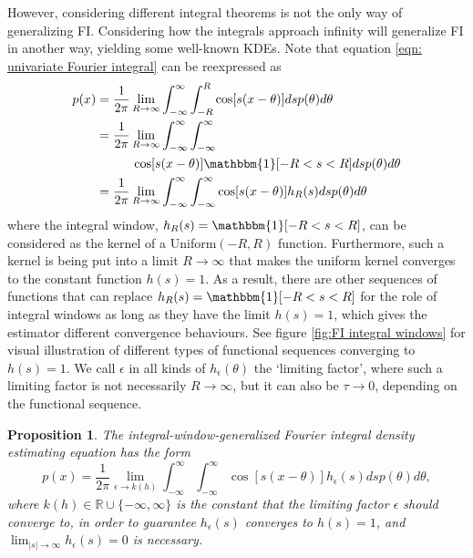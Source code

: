 \documentclass[%
 reprint,
 amsmath,amssymb,
 aps,
]{revtex4-2}
\newtheorem{proposition}[theorem]{Proposition}
\def\R{\mathbb{R}}
\begin{document}
However, considering different integral theorems is not the only way of generalizing FI. Considering how the integrals approach infinity will generalize FI in another way, yielding some well-known KDEs. Note that equation \eqref{eqn: univariate Fourier integral} can be reexpressed as
\begin{align*}
    p(x) & = \frac{1}{2\pi} \lim_{R \to \infty} \int_{-\infty}^\infty \int_{-R}^R \cos[s(x-\theta)]ds p(\theta)d\theta \\
    & = \frac{1}{2\pi} \lim_{R \to \infty} \int_{-\infty}^\infty \int_{-\infty}^\infty \\
    & \hspace{1cm}\cos[s(x-\theta)] \mathbbm{1}[-R < s < R] ds p(\theta) d\theta \\
    & = \frac{1}{2\pi} \lim_{R \to \infty} \int_{-\infty}^\infty \int_{-\infty}^\infty \cos[s(x-\theta)]h_R(s)ds p(\theta)d\theta
\end{align*}
where the integral window, $h_R(s) = \mathbbm{1}[-R < s < R]$, can be considered as the kernel of a Uniform$(-R, R)$ function. Furthermore, such a kernel is being put into a limit $R \to \infty$ that makes the uniform kernel converges to the constant function $h(s) = 1$. As a result, there are other sequences of functions that can replace $h_R(s) = \mathbbm{1}[-R < s < R]$ for the role of integral windows as long as they have the limit $h(s) = 1$, which gives the estimator different convergence behaviours. See figure \ref{fig:FI integral windows} for visual illustration of different types of functional sequences converging to $h(s) = 1$. We call $\epsilon$ in all kinds of $h_\epsilon(\theta)$ the `limiting factor', where such a limiting factor is not necessarily $R \to \infty$, but it can also be $\tau \to 0$, depending on the functional sequence.
\begin{proposition}
    The integral-window-generalized Fourier integral density estimating equation has the form
    \begin{equation} \label{eqn: integral window h(s)}
        p(x) = \frac{1}{2\pi} \lim_{\epsilon \to k(h)} \int_{-\infty}^\infty \int_{-\infty}^\infty \cos[s(x-\theta)]h_\epsilon(s)ds p(\theta)d\theta,
    \end{equation}
    where $k(h) \in \R \cup \{-\infty, \infty\}$ is the constant that the limiting factor $\epsilon$ should converge to, in order to guarantee $h_\epsilon(s)$ converges to $h(s) = 1$, and $\displaystyle\lim_{|s| \to \infty} h_\epsilon(s) = 0$ is necessary.
\end{proposition}
\end{document}
